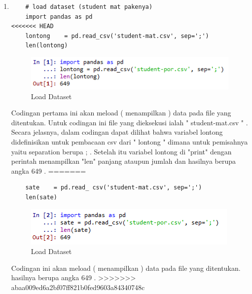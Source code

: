 \begin{enumerate}
\item
\begin{verbatim}
	# load dataset (student mat pakenya)
	import pandas as pd
<<<<<<< HEAD
	lontong    = pd.read_csv('student-mat.csv', sep=';')
	len(lontong)
\end{verbatim}
\begin{figure}[ht]
\centering
\includegraphics[scale=0.9]{figures/lontong/1.png}
\caption{Load Dataset}
\end{figure}
\par
	Codingan pertama ini akan meload ( menampilkan ) data pada file yang ditentukan. Untuk codingan ini file yang dieksekusi ialah " student-mat.csv " . Secara jelasnya, dalam codingan dapat dilihat bahwa variabel lontong didefinisikan untuk pembacaan csv dari " lontong " dimana untuk pemisahnya yaitu separation berupa ; . Setelah itu variabel lontong di "print" dengan perintah menampilkan "len" panjang ataupun jumlah dan hasilnya berupa angka 649 . 
=======
\begin{verbatim}
	sate    = pd.read_ csv('student-mat.csv', sep=';')
	len(sate)
\end{verbatim}
\begin{figure}[ht]
\centering
\includegraphics[scale=0.5]{figures/41.png}
\caption{Load Dataset}
\end{figure}
\par
	Codingan ini akan meload ( menampilkan ) data pada file yang ditentukan. hasilnya berupa angka 649 . 
>>>>>>> abaa009ed6a2bf07ff821b0fed9603a84340748c


\end{enumerate}
